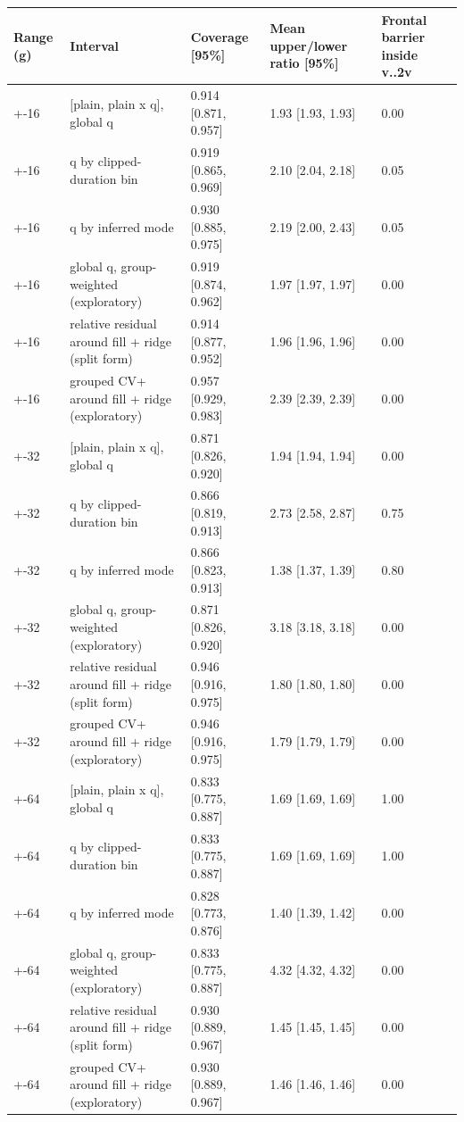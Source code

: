 \begin{tabular}{lllll}
\toprule
Range (g) & Interval & Coverage [95\%] & Mean upper/lower ratio [95\%] & Frontal barrier inside v..2v \\
\midrule
+-16 & [plain, plain x q], global q & 0.914 [0.871, 0.957] & 1.93 [1.93, 1.93] & 0.00 \\
+-16 & q by clipped-duration bin & 0.919 [0.865, 0.969] & 2.10 [2.04, 2.18] & 0.05 \\
+-16 & q by inferred mode & 0.930 [0.885, 0.975] & 2.19 [2.00, 2.43] & 0.05 \\
+-16 & global q, group-weighted (exploratory) & 0.919 [0.874, 0.962] & 1.97 [1.97, 1.97] & 0.00 \\
+-16 & relative residual around fill + ridge (split form) & 0.914 [0.877, 0.952] & 1.96 [1.96, 1.96] & 0.00 \\
+-16 & grouped CV+ around fill + ridge (exploratory) & 0.957 [0.929, 0.983] & 2.39 [2.39, 2.39] & 0.00 \\
+-32 & [plain, plain x q], global q & 0.871 [0.826, 0.920] & 1.94 [1.94, 1.94] & 0.00 \\
+-32 & q by clipped-duration bin & 0.866 [0.819, 0.913] & 2.73 [2.58, 2.87] & 0.75 \\
+-32 & q by inferred mode & 0.866 [0.823, 0.913] & 1.38 [1.37, 1.39] & 0.80 \\
+-32 & global q, group-weighted (exploratory) & 0.871 [0.826, 0.920] & 3.18 [3.18, 3.18] & 0.00 \\
+-32 & relative residual around fill + ridge (split form) & 0.946 [0.916, 0.975] & 1.80 [1.80, 1.80] & 0.00 \\
+-32 & grouped CV+ around fill + ridge (exploratory) & 0.946 [0.916, 0.975] & 1.79 [1.79, 1.79] & 0.00 \\
+-64 & [plain, plain x q], global q & 0.833 [0.775, 0.887] & 1.69 [1.69, 1.69] & 1.00 \\
+-64 & q by clipped-duration bin & 0.833 [0.775, 0.887] & 1.69 [1.69, 1.69] & 1.00 \\
+-64 & q by inferred mode & 0.828 [0.773, 0.876] & 1.40 [1.39, 1.42] & 0.00 \\
+-64 & global q, group-weighted (exploratory) & 0.833 [0.775, 0.887] & 4.32 [4.32, 4.32] & 0.00 \\
+-64 & relative residual around fill + ridge (split form) & 0.930 [0.889, 0.967] & 1.45 [1.45, 1.45] & 0.00 \\
+-64 & grouped CV+ around fill + ridge (exploratory) & 0.930 [0.889, 0.967] & 1.46 [1.46, 1.46] & 0.00 \\
\bottomrule
\end{tabular}

